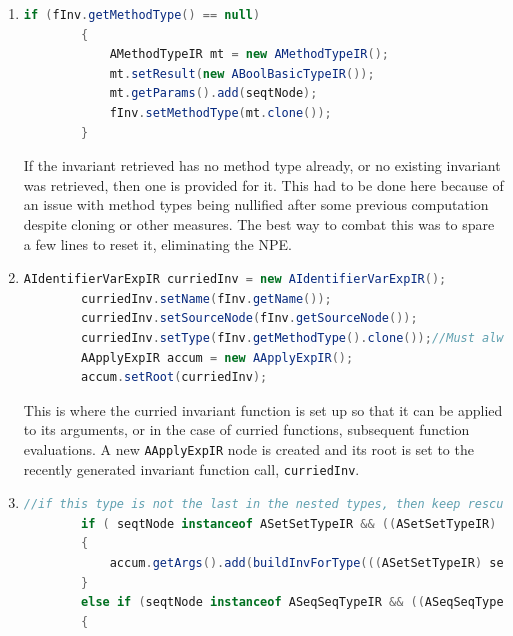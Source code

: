 \begin{enumerate}
		\item \begin{lstlisting}[language=Java]
		if (fInv.getMethodType() == null)
    	{
    		AMethodTypeIR mt = new AMethodTypeIR();
    		mt.setResult(new ABoolBasicTypeIR());
    		mt.getParams().add(seqtNode);
    		fInv.setMethodType(mt.clone());
    	}
		\end{lstlisting}
		If the invariant retrieved has no method type already, or no existing invariant was retrieved, then one is provided for it. This had to be done here because of an issue with method types being nullified after some previous computation despite cloning or other measures. The best way to combat this was to spare a few lines to reset it, eliminating the NPE.
		\item \begin{lstlisting}[language=Java]
		AIdentifierVarExpIR curriedInv = new AIdentifierVarExpIR();
        curriedInv.setName(fInv.getName());
        curriedInv.setSourceNode(fInv.getSourceNode());
        curriedInv.setType(fInv.getMethodType().clone());//Must always clone
    	AApplyExpIR accum = new AApplyExpIR();
    	accum.setRoot(curriedInv);
		\end{lstlisting}
		This is where the curried invariant function is set up so that it can be applied to its arguments, or in the case of curried functions, subsequent function evaluations. A new  \lstinline[language=Java]{AApplyExpIR} node is created and its root is set to the recently generated invariant function call,  \lstinline[language=Java]{curriedInv}.
		\hfill\break
		\hfill\break
		\hfill\break
		\item \begin{lstlisting}[language=Java]
		//if this type is not the last in the nested types, then keep rescursing until we get to the final nested type
    	if ( seqtNode instanceof ASetSetTypeIR && ((ASetSetTypeIR) seqtNode).getSetOf() != null )
    	{
    		accum.getArgs().add(buildInvForType(((ASetSetTypeIR) seqtNode).getSetOf().clone()));
    	}
    	else if (seqtNode instanceof ASeqSeqTypeIR && ((ASeqSeqTypeIR) seqtNode).getSeqOf() != null)
    	{
    		

\end{lstlisting}
\end{enumerate}
